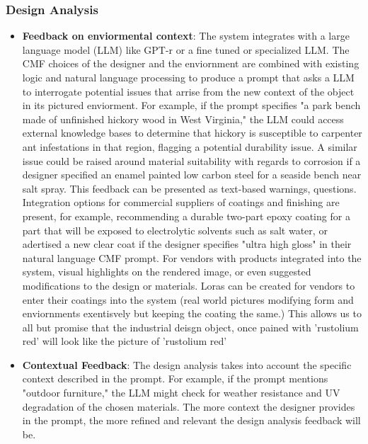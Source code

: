 \documentclass[12pt]{report}
\begin{document}
\subsubsection{Design Analysis}
\begin{itemize}
\item \textbf{Feedback on enviormental context}: The system integrates with a large language model (LLM) like GPT-r or a fine tuned or specialized LLM. The CMF choices of the designer and the enviornment are combined with existing logic and natural language processing to produce a prompt that asks a LLM to interrogate potential issues that arrise from the new context of the object in its pictured enviorment. For example, if the prompt specifies "a park bench made of unfinished hickory wood in West Virginia," the LLM could access external knowledge bases to determine that hickory is susceptible to carpenter ant infestations in that region, flagging a potential durability issue. A similar issue could be raised around material suitability with regards to corrosion if a designer specified an enamel painted low carbon steel for a seaside bench near salt spray. This feedback can be presented as text-based warnings, questions. Integration options for commercial suppliers of coatings and finishing are present, for example, recommending a durable two-part epoxy coating for a part that will be exposed to electrolytic solvents such as salt water, or adertised a new clear coat if the designer specifies "ultra high gloss" in their natural language CMF prompt. For vendors with products integrated into the system,  visual highlights on the rendered image, or even suggested modifications to the design or materials. Loras can be created for vendors to enter their coatings into the system (real world pictures modifying form and enviornments exentisvely  but keeping the coating the same.) This allows us to all but promise that the industrial deisgn object, once pained with 'rustolium red' will look like the picture of 'rustolium red'  
\item \textbf{Contextual Feedback}: The design analysis takes into account the specific context described in the prompt. For example, if the prompt mentions "outdoor furniture," the LLM might check for weather resistance and UV degradation of the chosen materials. The more context the designer provides in the prompt, the more refined and relevant the design analysis feedback will be.
\end{itemize}
\end{document}
